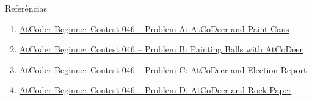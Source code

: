 \begin{frame}[fragile]{Referências}

    \begin{enumerate}
        \item \href{https://atcoder.jp/contests/abc046/tasks/abc046_a}{AtCoder Beginner Contest 
            046 -- Problem A: AtCoDeer and Paint Cans}

        \item \href{https://atcoder.jp/contests/abc046/tasks/abc046_b}{AtCoder Beginner Contest 
            046 -- Problem B: Painting Balls with AtCoDeer}

        \item \href{https://atcoder.jp/contests/abc046/tasks/arc062_a}{AtCoder Beginner Contest
            046 -- Problem C: AtCoDeer and Election Report}

        \item \href{https://atcoder.jp/contests/abc046/tasks/arc062_b}{AtCoder Beginner Contest
            046 -- Problem D: AtCoDeer and Rock-Paper}
    \end{enumerate}

\end{frame}
